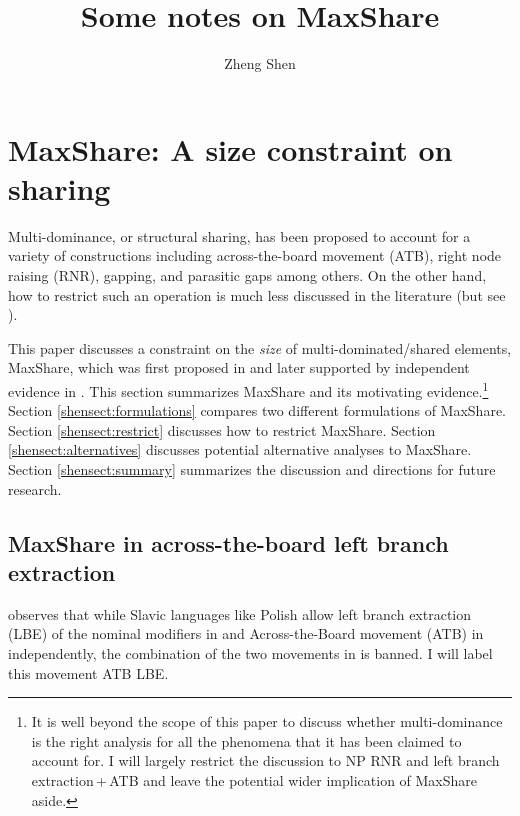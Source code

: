 \documentclass[output=paper]{langscibook}
\author{Zheng Shen\affiliation{National University of Singapore}}
\title{Some notes on MaxShare}
\begin{document}
\maketitle


\section{MaxShare: A size constraint on sharing}
\label{shensect:intro}
Multi-dominance, or structural sharing,  has been proposed to account for a variety of constructions including across-the-board movement (ATB), right node raising (RNR), gapping, and  parasitic gaps among others.
On the other hand, how to restrict such an operation is much less discussed in the literature (but see \citealt{Gracanin-Yuksek:2007}). 

This paper discusses a constraint on the \textit{size} of multi-dominated\slash shared elements, MaxShare, which was first proposed in \citet{Citko:2006} and later supported by independent evidence in \citet{Shen:2018a}.  
This section summarizes MaxShare and its motivating evidence.\footnote{It is well beyond the scope of this paper to discuss whether multi-dominance is the right analysis for all the phenomena that it has been claimed to account for. 
I will largely restrict the discussion to NP RNR and left branch extraction\,+\,ATB and leave the potential wider implication of MaxShare aside.}  
Section \ref{shensect:formulations} compares  two different formulations of MaxShare. 
Section \ref{shensect:restrict} discusses how to restrict MaxShare. 
Section \ref{shensect:alternatives} discusses potential alternative analyses to MaxShare. 
Section \ref{shensect:summary} summarizes the discussion and directions for future research.\largerpage[-1]

\subsection{MaxShare in across-the-board left branch extraction}
\label{shensect:atb}

\citet{Citko:2006} observes that while Slavic languages like Polish allow left branch extraction (LBE) of the nominal modifiers in  and Across-the-Board movement (ATB) in  independently, the combination of the two movements in  is banned. I will label this movement ATB LBE.
\end{document}
